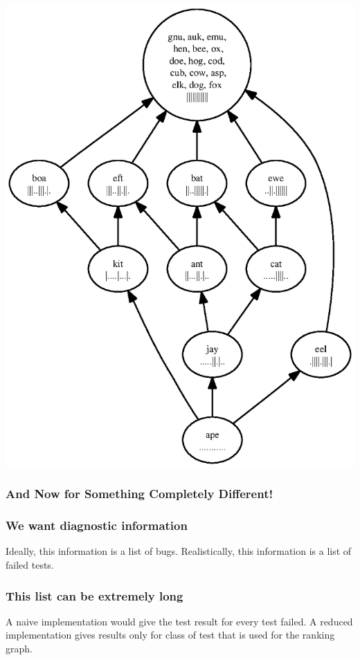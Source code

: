\documentclass[svgnames]{beamer}
\theoremstyle{definition}
\begin{document}
\begin{frame}
\centerline{\includegraphics[height=\textheight]{success.ps}}
\end{frame}

\begin{frame}
\frametitle{And Now for Something Completely Different!}
\end{frame}

\begin{frame}
\frametitle{We want diagnostic information}
Ideally, this information is a list of bugs.
\newline\newline
Realistically, this information is a list of failed tests.
\end{frame}

\begin{frame}
\frametitle{This list can be extremely long}
A naive implementation would give the test result for every test failed.
\newline\newline
A reduced implementation gives results only for class of test that is used for the ranking graph.
\end{frame}
\end{document}
